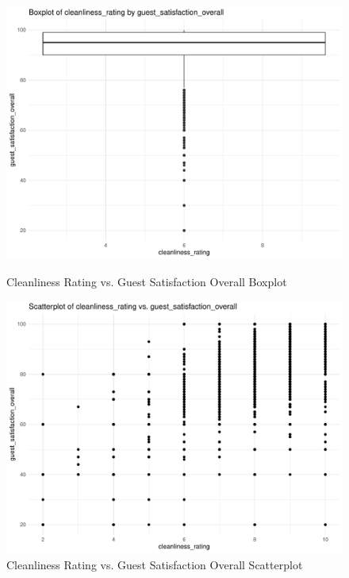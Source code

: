 \documentclass[12pt, letterpaper]{article}
\begin{document}
\begin{figure}[H]
  \begin{minipage}{0.45\textwidth}
    \includegraphics[width=\linewidth]{cleanliness_rating_guest_satisfaction_overall__boxplot.pdf}
    \caption{Cleanliness Rating vs. Guest Satisfaction Overall Boxplot}
    \label{fig:cleanliness_rating_guest_satisfaction_overall__boxplot}
  \end{minipage}
  \hspace{0.05\textwidth}
  \begin{minipage}{0.45\textwidth}
    \includegraphics[width=\linewidth]{cleanliness_rating_guest_satisfaction_overall__scatterplot.pdf}
    \caption{Cleanliness Rating vs. Guest Satisfaction Overall Scatterplot}
    \label{fig:cleanliness_rating_guest_satisfaction_overall__scatterplot}
  \end{minipage}


\end{figure}
\end{document}
